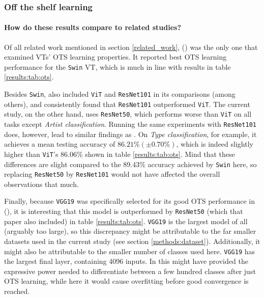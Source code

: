 \subsubsection{Off the shelf learning}

\paragraph{How do these results compare to related studies?}
Of all related work mentioned in section \ref{related_work}, \citeauthor{zhou2021convnets} (\citeyear{zhou2021convnets}) was the only one that examined VTs' OTS learning properties. It reported best OTS learning performance for the \texttt{Swin} VT, which is much in line with results in table \ref{results:tab:ots}.

Besides \texttt{Swin}, \citeauthor{zhou2021convnets} also included \texttt{ViT} and \texttt{ResNet101} in its comparisons (among others), and consistently found that \texttt{ResNet101} outperformed \texttt{ViT}. The current study, on the other hand, uses \texttt{ResNet50}, which performs worse than \texttt{ViT} on all tasks except \textit{Artist classification}. Running the same experiments with \texttt{ResNet101} does, however, lead to similar findings as \citeauthor{zhou2021convnets}. On \textit{Type classification}, for example, it achieves a mean testing accuracy of  $86.21\% (\pm 0.70\%)$, which is indeed slightly higher than \texttt{ViT}'s 86.06\% shown in table \ref{results:tab:ots}. Mind that these differences are slight compared to the 89.43\% accuracy achieved by \texttt{Swin} here, so replacing \texttt{ResNet50} by \texttt{ResNet101} would not have affected the overall observations that much.

Finally, because \texttt{VGG19} was specifically selected for its good OTS performance in \citeauthor{sabatelli2018deep} (\citeyear{sabatelli2018deep}), it is interesting that this model is outperformed by \texttt{ResNet50} (which that paper also included) in table \ref{results:tab:ots}. \texttt{VGG19} is the largest model of all (arguably too large), so this discrepancy might be attributable to the far smaller datasets used in the current study (see section \ref{methods:dataset}). Additionally, it might also be attributable to the smaller number of classes used here. \texttt{VGG19} has the largest final layer, containing 4096 inputs. In \citeauthor{sabatelli2018deep} this might have provided the expressive power needed to differentiate between a few hundred classes after just OTS learning, while here it would cause overfitting before good convergence is reached.

